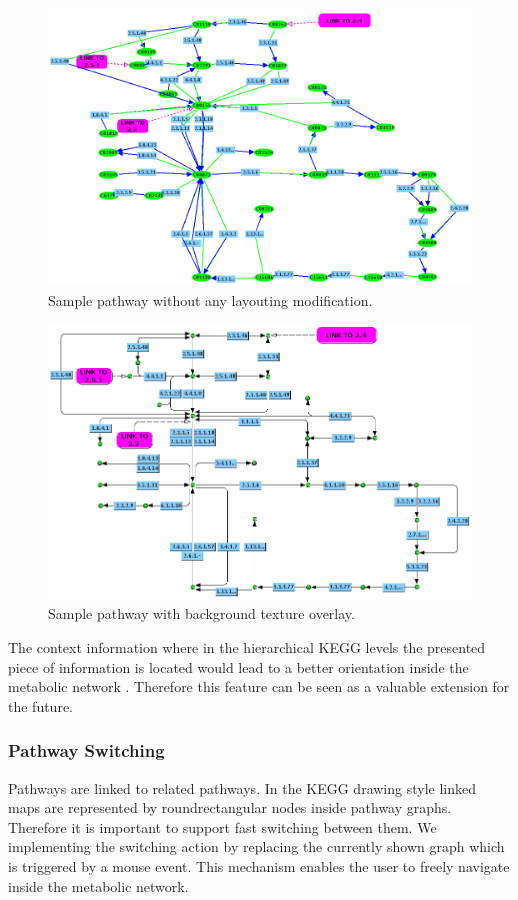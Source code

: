 \begin{figure}[ht]
  \centering
    \includegraphics[width=0.7\linewidth]{gfx/sample_pathway_jgraph}
  \caption{Sample pathway without any layouting modification.}
  \label{fig:sample_pathway_jgraph}
\end{figure}

\begin{figure}[ht]
  \centering
    \includegraphics[width=0.7\linewidth]{gfx/sample_pathway_jgraph_background}
  \caption{Sample pathway with background texture overlay.}
  \label{fig:sample_pathway_jgraph_background}
\end{figure}

The context information where in the hierarchical KEGG levels the presented piece of information is located would lead to a better orientation inside the metabolic network \citep{Jourdan2003}. Therefore this feature can be seen as a valuable extension for the future. 

\subsubsection{Pathway Switching}

Pathways are linked to related pathways. In the KEGG drawing style linked maps are represented by roundrectangular nodes inside pathway graphs. Therefore it is important to support fast switching between them. We implementing the switching action by replacing the currently shown graph which is triggered by a mouse event. This mechanism enables the user to freely navigate inside the metabolic network.

